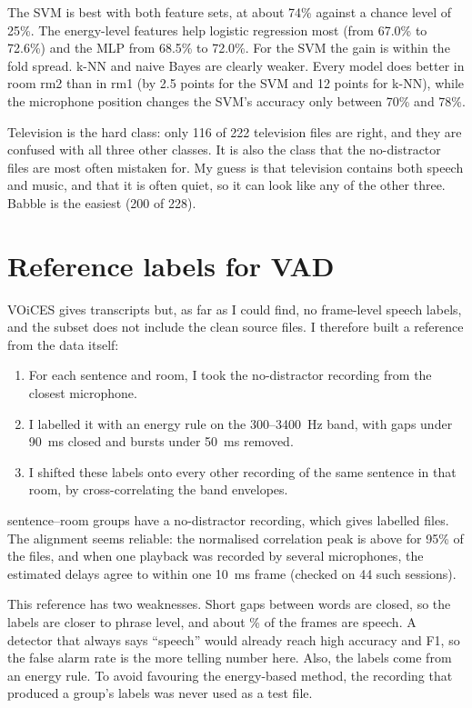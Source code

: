 \documentclass[11pt,a4paper]{article}
\begin{document}


The SVM is best with both feature sets, at about 74\% against a chance level of 25\%. The energy-level features help logistic regression most (from 67.0\% to 72.6\%) and the MLP from 68.5\% to 72.0\%. For the SVM the gain is within the fold spread. k-NN and naive Bayes are clearly weaker. Every model does better in room rm2 than in rm1 (by 2.5 points for the SVM and 12 points for k-NN), while the microphone position changes the SVM's accuracy only between 70\% and 78\%.



Television is the hard class: only 116 of 222 television files are right, and they are confused with all three other classes. It is also the class that the no-distractor files are most often mistaken for. My guess is that television contains both speech and music, and that it is often quiet, so it can look like any of the other three. Babble is the easiest (200 of 228).

\section{Reference labels for VAD}
VOiCES gives transcripts but, as far as I could find, no frame-level speech labels, and the subset does not include the clean source files. I therefore built a reference from the data itself:
\begin{enumerate}[nosep,leftmargin=*]
\item For each sentence and room, I took the no-distractor recording from the closest microphone.
\item I labelled it with an energy rule on the 300--3400~Hz band, with gaps under 90~ms closed and bursts under 50~ms removed.
\item I shifted these labels onto every other recording of the same sentence in that room, by cross-correlating the band envelopes.
\end{enumerate}
\VGroups{} sentence--room groups have a no-distractor recording, which gives \VLab{} labelled files. The alignment seems reliable: the normalised correlation peak is above \VPeak{} for 95\% of the files, and when one playback was recorded by several microphones, the estimated delays agree to within one 10~ms frame (checked on 44 such sessions).

This reference has two weaknesses. Short gaps between words are closed, so the labels are closer to phrase level, and about \VShare\% of the frames are speech. A detector that always says ``speech'' would already reach high accuracy and F1, so the false alarm rate is the more telling number here. Also, the labels come from an energy rule. To avoid favouring the energy-based method, the recording that produced a group's labels was never used as a test file.
\end{document}
